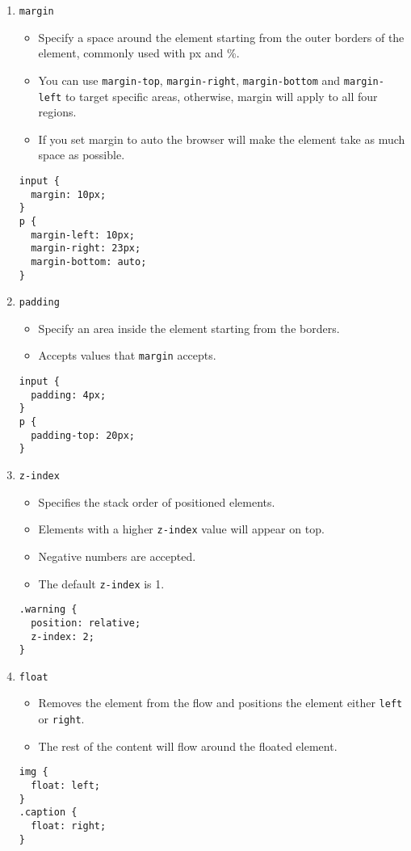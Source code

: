 \documentclass[12pt]{article}
\begin{document}
\begin{enumerate}
\item{\texttt{margin}}
\begin{itemize}
    \item Specify a space around the element starting from the outer borders of the element, commonly used with px and \%.  
    \item You can use \texttt{margin-top}, \texttt{margin-right}, \texttt{margin-bottom} and \texttt{margin-left} to target specific areas, otherwise, margin will apply to all four regions.\item If you set margin to auto the browser will make the element take as much space as possible.
\end{itemize}    
\begin{lstlisting}[frame=single]
input {
  margin: 10px; 
}
p {
  margin-left: 10px;
  margin-right: 23px;
  margin-bottom: auto;
}
\end{lstlisting}
    
\item{\texttt{padding}}
\begin{itemize}
    \item Specify an area inside the element starting from the borders.
    \item Accepts values that \texttt{margin} accepts.
\end{itemize}    
\begin{lstlisting}[frame=single]
input {
  padding: 4px;
}
p {
  padding-top: 20px;
}
\end{lstlisting}
\item{\texttt{z-index}}
\begin{itemize}
    \item Specifies the stack order of positioned elements.  
    \item Elements with a higher \texttt{z-index} value will appear on top.  
    \item Negative numbers are accepted.  
    \item The default \texttt{z-index} is 1.
\end{itemize}    
\begin{lstlisting}[frame=single]
.warning {
  position: relative;
  z-index: 2;
}
\end{lstlisting}

\item{\texttt{float}}
\begin{itemize}
    \item Removes the element from the flow and positions the element either \texttt{left} or \texttt{right}. 
    \item The rest of the content will flow around the floated element.
\end{itemize}    
\begin{lstlisting}[frame=single]
img {
  float: left;
}
.caption {
  float: right;
}
\end{lstlisting}


\end{enumerate}
\end{document}
